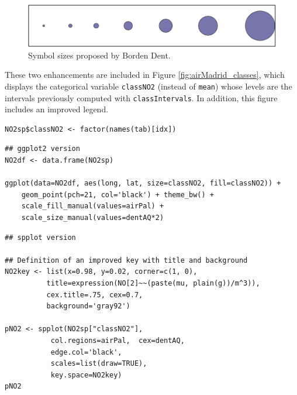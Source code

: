\documentclass[smallroyalvopaper]{memoir}
\begin{document}
\begin{figure}[htb]
\centering
\includegraphics[width=.9\linewidth]{figs/dent.pdf}
\caption{\label{fig:dent}Symbol sizes proposed by Borden Dent.}
\end{figure}

These two enhancements are included in Figure
\ref{fig:airMadrid_classes}, which displays the categorical variable
\texttt{classNO2} (instead of \texttt{mean}) whose levels are the intervals
previously computed with \texttt{classIntervals}. In addition, this
figure includes an improved legend.

\lstset{language=R,numbers=none}
\begin{lstlisting}
NO2sp$classNO2 <- factor(names(tab)[idx])
\end{lstlisting}

\lstset{language=R,numbers=none}
\begin{lstlisting}
## ggplot2 version
NO2df <- data.frame(NO2sp)

ggplot(data=NO2df, aes(long, lat, size=classNO2, fill=classNO2)) +
    geom_point(pch=21, col='black') + theme_bw() +
    scale_fill_manual(values=airPal) +
    scale_size_manual(values=dentAQ*2)
\end{lstlisting}

\lstset{language=R,numbers=none}
\begin{lstlisting}
## spplot version

## Definition of an improved key with title and background
NO2key <- list(x=0.98, y=0.02, corner=c(1, 0),
	      title=expression(NO[2]~~(paste(mu, plain(g))/m^3)),
	      cex.title=.75, cex=0.7,
	      background='gray92')

pNO2 <- spplot(NO2sp["classNO2"],
	       col.regions=airPal,  cex=dentAQ,
	       edge.col='black',
	       scales=list(draw=TRUE),
	       key.space=NO2key)
pNO2
\end{lstlisting}
\end{document}
